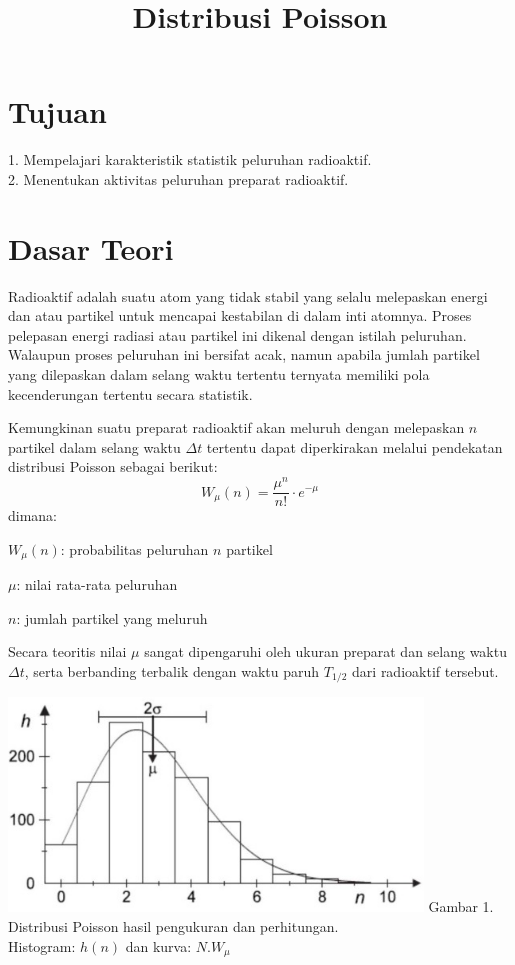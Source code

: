\documentclass{article}
\title{Distribusi Poisson}
\date{}
\author{}
\begin{document}
	\maketitle
	
	\section*{Tujuan}
		1. Mempelajari karakteristik statistik peluruhan radioaktif.\\
		2. Menentukan aktivitas peluruhan preparat radioaktif.
	
	\section*{Dasar Teori}
	 
		\hspace{0.35 cm} Radioaktif adalah suatu atom yang tidak stabil yang selalu melepaskan energi dan atau partikel untuk mencapai kestabilan di dalam inti atomnya. Proses pelepasan energi radiasi atau partikel ini dikenal dengan istilah peluruhan. Walaupun proses peluruhan ini bersifat acak, namun apabila jumlah partikel yang dilepaskan dalam selang waktu tertentu ternyata memiliki pola kecenderungan tertentu secara statistik.\par
		Kemungkinan suatu preparat radioaktif akan meluruh dengan melepaskan $n$ partikel dalam selang waktu $\Delta t$ tertentu dapat diperkirakan melalui pendekatan distribusi Poisson
		sebagai berikut: 
		\begin{equation}
		W_{\mu}(n) = \frac{\mu^n}{n!}\cdot e^{-\mu}
		\end{equation}
		dimana:
		\par $W_{\mu}(n)$: probabilitas peluruhan $n$ partikel
		\par $\mu$: nilai rata-rata peluruhan
		\par $n$: jumlah partikel yang meluruh \\
		
		\par Secara teoritis nilai $\mu$ sangat dipengaruhi oleh ukuran preparat dan selang waktu $\Delta t$, serta berbanding terbalik dengan waktu paruh $T_{1/2}$ dari radioaktif tersebut. 
	
		
		
		\begin{center}
			\includegraphics[width=110mm]{Picture/1.jpg}
			Gambar 1. Distribusi Poisson hasil pengukuran dan perhitungan. \\ Histogram: $h(n)$ dan kurva: $N.W_{\mu}$
		\end{center}
		
\end{document}
